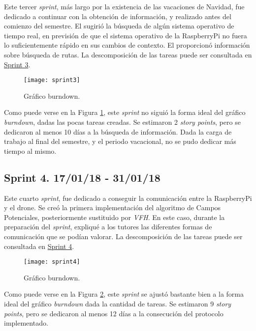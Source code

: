 Este tercer \emph{sprint}, más largo por la existencia de las vacaciones de Navidad, fue dedicado a continuar con la obtención de información, y realizado antes del comienzo del semestre.
El \tutor{} sugirió la búsqueda de algún sistema operativo de tiempo real, en previsión de que el sistema operativo de la RaspberryPi no fuera lo suficientemente rápido en sus cambios de contexto.
El \cotutorTwo{} proporcionó información sobre búsqueda de rutas. 
La descomposición de las tareas puede ser consultada en \href{https://github.com/mbm0089/gii_0_17.02_snsi/milestone/3?closed=1}{Sprint 3}.

\begin{figure}
	\centering
	\texttt{[image: sprint3]}
	\caption[Burndown Sprint 3]{Gráfico burndown.}\label{fig:sprint3}
\end{figure}

Como puede verse en la Figura \ref{fig:sprint3}, este \emph{sprint} no siguió la forma ideal del gráfico \emph{burndown}, dadas las pocas tareas creadas. 
Se estimaron 2 \emph{story points}, pero se dedicaron al menos 10 días a la búsqueda de información. Dada la carga de trabajo al final del semestre, y el periodo vacacional, no se pudo dedicar más tiempo al mismo.

\subsection{Sprint 4. 17/01/18 - 31/01/18}

Este cuarto \emph{sprint}, fue dedicado a conseguir la comunicación entre la RaspberryPi y el drone. Se creó la primera implementación del algoritmo de Campos Potenciales, posteriormente sustituido por \emph{VFH}.
En este caso, durante la preparación del \emph{sprint}, expliqué a los tutores las diferentes formas de comunicación que se podían valorar.
La descomposición de las tareas puede ser consultada en \href{https://github.com/mbm0089/gii_0_17.02_snsi/milestone/4?closed=1}{Sprint 4}.

\begin{figure}
	\centering
	\texttt{[image: sprint4]}
	\caption[Burndown Sprint 4]{Gráfico burndown.}\label{fig:sprint4}
\end{figure}

Como puede verse en la Figura \ref{fig:sprint4}, este \emph{sprint} se ajustó bastante bien a la forma ideal del gráfico \emph{burndown} dada la cantidad de tareas.
Se estimaron 9 \emph{story points}, pero se dedicaron al menos 12 días a la consecución del protocolo implementado.

